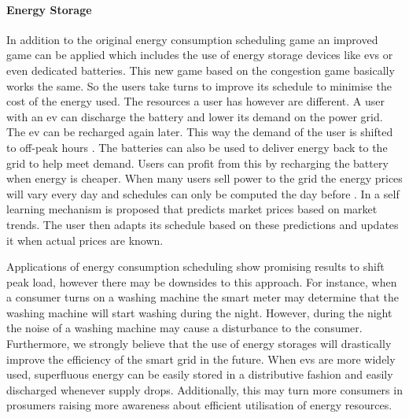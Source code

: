 \paragraph{Energy Storage}
In addition to the original energy consumption scheduling game an improved game can be applied which includes the use of energy storage devices like \acp{ev} or even dedicated batteries. This new game based on the congestion game basically works the same. So the users take turns to improve its schedule to minimise the cost of the energy used. The resources a user has however are different. A user with an \ac{ev} can discharge the battery and lower its demand on the power grid. The \ac{ev} can be recharged again later. This way the demand of the user is shifted to off-peak hours \cite{NguyenSongHan2012}. The batteries can also be used to deliver energy back to the grid to help meet demand. Users can profit from this by recharging the battery when energy is cheaper. When many users sell power to the grid the energy prices will vary every day and schedules can only be computed the day before \cite{VytelingumVoiceRamchurnEtAl2010}. In \cite{VytelingumVoiceRamchurnEtAl2010} a self learning mechanism is proposed that predicts market prices based on market trends. The user then adapts its schedule based on these predictions and updates it when actual prices are known.

Applications of energy consumption scheduling show promising results to shift peak load, however there may be downsides to this approach. For instance, when a consumer turns on a washing machine the smart meter may determine that the washing machine will start washing during the night. However, during the night the noise of a washing machine may cause a disturbance to the consumer. Furthermore, we strongly believe that the use of energy storages will drastically improve the efficiency of the smart grid in the future. When \acp{ev} are more widely used, superfluous energy can be easily stored in a distributive fashion and easily discharged whenever supply drops. Additionally, this may turn more consumers in prosumers raising more awareness about efficient utilisation of energy resources. 